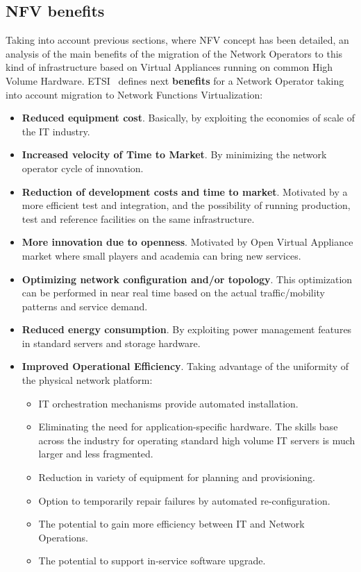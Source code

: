\documentclass[a4paper, 12pt]{book}
\begin{document}
\subsection{NFV benefits}
\label{subsec:nvfbenefits}

Taking into account previous sections, where NFV concept has been detailed, an analysis of the main benefits of the migration of the Network Operators to this kind of infrastructure based on Virtual Appliances running on common High Volume Hardware. ETSI~\cite{ETSINFVDefinition} defines next \textbf{benefits} for a Network Operator taking into account migration to Network Functions Virtualization:

\begin{itemize}\itemsep0pt
 \item{\textbf{Reduced equipment cost}}. Basically, by exploiting the economies of scale of the IT industry.
 \item{\textbf{Increased velocity of Time to Market}}. By minimizing the network operator cycle of innovation.
 \item{\textbf{Reduction of development costs and time to market}}. Motivated by a more efficient test and integration, and the possibility of running production, test and reference facilities on the same infrastructure.
 \item{\textbf{More innovation due to openness}}. Motivated by Open Virtual Appliance market where small players and academia can bring new services.
 \item{\textbf{Optimizing network configuration and/or topology}}. This optimization can be performed in near real time based on the actual traffic/mobility patterns and service demand.
 \item{\textbf{Reduced energy consumption}}. By exploiting power management features in standard servers and storage hardware.
 \item{\textbf{Improved Operational Efficiency}}. Taking advantage of the uniformity of the physical network platform:
 \begin{itemize}\itemsep0pt
    \item{IT orchestration mechanisms provide automated installation}.
    \item{Eliminating the need for application-specific hardware}. The skills base across the industry for operating standard high volume IT servers is much larger and less fragmented.
    \item{Reduction in variety of equipment for planning and provisioning}.
    \item{Option to temporarily repair failures by automated re-configuration}.
    \item{The potential to gain more efficiency between IT and Network Operations}.
    \item{The potential to support in-service software upgrade}.
 \end{itemize}
\end{itemize}
\end{document}
